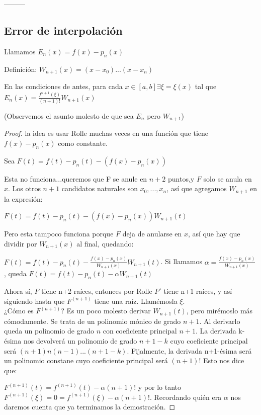 \documentclass[10pt,a4paper,final]{report}
\begin{document}
---------

\subsection{Error de interpolación}

Llamamos $E_n(x) = f(x) - p_n(x)$

Definición: $W_{n+1}(x)=(x-x_0)...(x-x_n)$


\begin{theorem} En las condiciones de antes, para cada $x \in [a,b] \exists \xi=\xi(x)$ tal que $E_n(x) = \frac{f^{n+1}(\xi)}{(n+1)!} W_{n+1}(x)$

(Observemos el asunto molesto de que sea $E_n$ pero $W_{n+1}$)\\

\end{theorem}

\begin{proof}la idea es usar Rolle muchas veces en una función que tiene $f(x)-p_n(x)$ como constante.


Sea $F(t) = f(t) - p_n(t) - (f(x) - p_n(x))$

Esta no funciona...queremos que F se anule en $n+2$ puntos,y $F$ solo se anula en $x$. Los otros $n+1$ candidatos naturales son $x_0,...,x_n$, así que agregamos $W_{n+1}$ en la expresión:

$F(t) = f(t) - p_n(t) - (f(x) - p_n(x)) W_{n+1}(t)$

Pero esta tampoco funciona porque $F$ deja de anularse en $x$, así que hay que dividir por $W_{n+1}(x)$ al final, quedando:

$F(t) = f(t) - p_n(t) - \frac{f(x)-p_n(x)}{W_{n+1}(x)} W_{n+1}(t)$. Si llamamos $\alpha = \frac{f(x)-p_n(x)}{W_{n+1}(x)}$, queda $F(t) = f(t) - p_n(t) - \alpha W_{n+1}(t)$

Ahora sí, $F$ tiene n+2 raíces, entonces por Rolle $F'$ tiene n+1 raíces, y así siguiendo hasta que $F^{(n+1)}$ tiene una raíz. Llamémosla $\xi$.\\

¿Cómo es $F^{(n+1)}$? Es un poco molesto derivar $W_{n+1}(t)$, pero mirémoslo más cómodamente. Se trata de un polinomio mónico de grado $n+1$. Al derivarlo queda un polinomio de grado $n$ con coeficiente principal $n+1$. La derivada k-ésima nos devolverá un polinomio de grado $n+1-k$ cuyo coeficiente principal será $(n+1)n(n-1)...(n+1-k)$. Fijalmente, la derivada n+1-ésima será un polinomio constane cuyo coeficiente principal será $(n+1)!$ Esto nos dice que:

$F^{(n+1)}(t) = f^{(n+1)}(t)- \alpha (n+1)!$ y por lo tanto $F^{(n+1)}(\xi)= 0 = f^{(n+1)}(\xi) - \alpha (n+1)!$. Recordando quién era $\alpha$ nos daremos cuenta que ya terminamos la demostración.

\end{proof}
\end{document}
